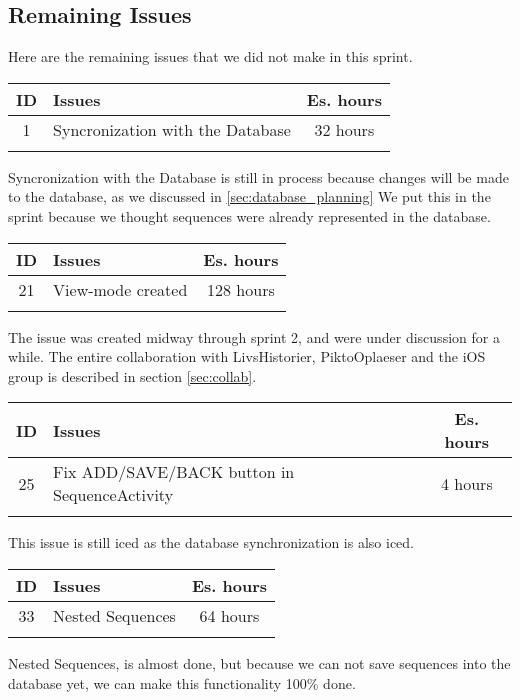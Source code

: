 \subsection{Remaining Issues}
\label{subsec:spr2_RemainingIssues}
Here are the remaining issues that we did not make in this sprint.

\begin{longtable} { | c | p{12cm} | c | } 
\hline
	ID 	&	Issues	&		 Es. hours \\\hline
	1	&	Syncronization with the Database 	&	32 hours	\\\hline
\label{tab:spr4_copyingsequences}
\end{longtable}

Syncronization with the Database is still in process because changes will be made to the database, as we discussed in \ref{sec:database_planning} We put this in the sprint because we thought sequences were already represented in the database.


\begin{longtable} { | c | p{12cm} | c | } 
\hline
	ID 	&	Issues	&		 Es. hours \\\hline
	21	&	View-mode created 	&	128 hours	\\\hline
\label{tab:spr4_copyingsequences}
\end{longtable}

The issue was created midway through sprint 2, and were under discussion for a while. The entire collaboration with LivsHistorier, PiktoOplaeser and the iOS group is described in section \ref{sec:collab}.\\

\begin{longtable} { | c | p{12cm} | c | } 
\hline
	ID 	&	Issues	&		 Es. hours \\\hline
	25	&	Fix ADD/SAVE/BACK button in SequenceActivity 	&	4 hours	\\\hline
\label{tab:spr4_copyingsequences}
\end{longtable}

This issue is still iced as the database synchronization is also iced.


\begin{longtable} { | c | p{12cm} | c | } 
\hline
	ID 	&	Issues	&		 Es. hours \\\hline
	33	&	Nested Sequences 	&	64 hours	\\\hline
\label{tab:spr4_copyingsequences}
\end{longtable}

Nested Sequences, is almost done, but because we can not save sequences into the database yet, we can make this functionality 100\% done.\\